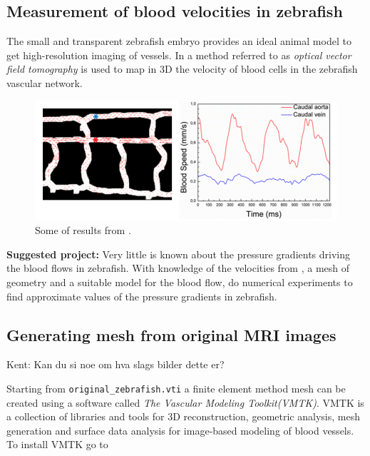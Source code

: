 \documentclass[epsfig,11pt]{article}
\begin{document}
\subsection{Measurement of blood velocities in zebrafish}

The small and transparent zebrafish embryo provides an ideal animal model to get high-resolution imaging of vessels. In \cite{fieramonti2015quantitative} a method referred to as \emph{optical vector field tomography} is used to map in 3D the velocity of blood cells in the zebrafish vascular network. 

\begin{figure}[h!] 
\begin{center}
  \includegraphics[scale=0.5]{blood_velocities.png}
  \end{center}
  \caption{Some of results from \cite{fieramonti2015quantitative}.}
\end{figure}

\textbf{Suggested project:} Very little is known about the pressure gradients driving the blood flows in zebrafish. With knowledge of the velocities from \cite{fieramonti2015quantitative}, a mesh of geometry and a suitable model for the blood flow, do numerical experiments to find approximate values of the pressure gradients in zebrafish.

\subsection{Generating mesh from original MRI images}

{\color{red} Kent: Kan du si noe om hva slags bilder dette er?}

Starting from \texttt{original\_zebrafish.vti} a finite element method mesh can be created using a software called \emph{The Vascular Modeling Toolkit(VMTK)}. VMTK is a collection of libraries and tools for 3D reconstruction, geometric analysis, mesh generation and surface data analysis for image-based modeling of blood vessels. To install VMTK go to 
\end{document}
